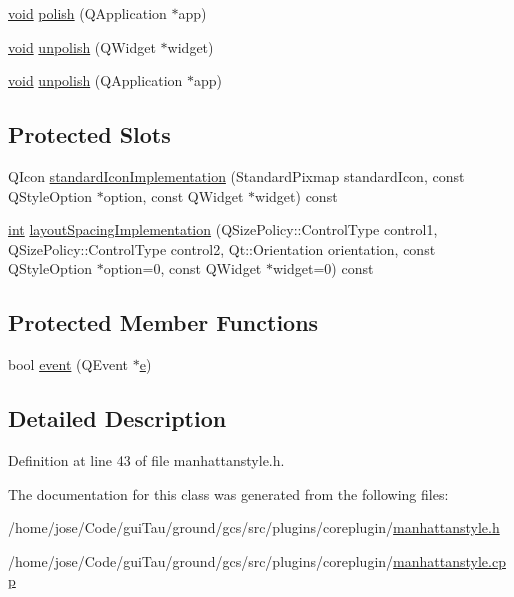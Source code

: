 \begin{DoxyCompactItemize}
\item 
\hyperlink{group___u_a_v_objects_plugin_ga444cf2ff3f0ecbe028adce838d373f5c}{void} \hyperlink{group___core_plugin_ga92648f0b5ff41cd6fc94ff98a84ecf37}{polish} (Q\-Application $\ast$app)
\item 
\hyperlink{group___u_a_v_objects_plugin_ga444cf2ff3f0ecbe028adce838d373f5c}{void} \hyperlink{group___core_plugin_gad6eebdec94a84337c3998d9533972323}{unpolish} (Q\-Widget $\ast$widget)
\item 
\hyperlink{group___u_a_v_objects_plugin_ga444cf2ff3f0ecbe028adce838d373f5c}{void} \hyperlink{group___core_plugin_gadcb93368b3bfbbc6746025b2d68e8dfe}{unpolish} (Q\-Application $\ast$app)
\end{DoxyCompactItemize}
\subsection*{Protected Slots}
\begin{DoxyCompactItemize}
\item 
Q\-Icon \hyperlink{group___core_plugin_ga391def9791426400daf51a02a5a58786}{standard\-Icon\-Implementation} (Standard\-Pixmap standard\-Icon, const Q\-Style\-Option $\ast$option, const Q\-Widget $\ast$widget) const 
\item 
\hyperlink{ioapi_8h_a787fa3cf048117ba7123753c1e74fcd6}{int} \hyperlink{group___core_plugin_gad167bd25b1d2b81313748886998fce7d}{layout\-Spacing\-Implementation} (Q\-Size\-Policy\-::\-Control\-Type control1, Q\-Size\-Policy\-::\-Control\-Type control2, Qt\-::\-Orientation orientation, const Q\-Style\-Option $\ast$option=0, const Q\-Widget $\ast$widget=0) const 
\end{DoxyCompactItemize}
\subsection*{Protected Member Functions}
\begin{DoxyCompactItemize}
\item 
bool \hyperlink{group___core_plugin_ga29cc9967198a03aa17cc33cf50d8a11e}{event} (Q\-Event $\ast$\hyperlink{_o_p_plots_8m_a9425be9aab51621e317ba7ade564b570}{e})
\end{DoxyCompactItemize}


\subsection{Detailed Description}


Definition at line 43 of file manhattanstyle.\-h.



The documentation for this class was generated from the following files\-:\begin{DoxyCompactItemize}
\item 
/home/jose/\-Code/gui\-Tau/ground/gcs/src/plugins/coreplugin/\hyperlink{manhattanstyle_8h}{manhattanstyle.\-h}\item 
/home/jose/\-Code/gui\-Tau/ground/gcs/src/plugins/coreplugin/\hyperlink{manhattanstyle_8cpp}{manhattanstyle.\-cpp}\end{DoxyCompactItemize}
